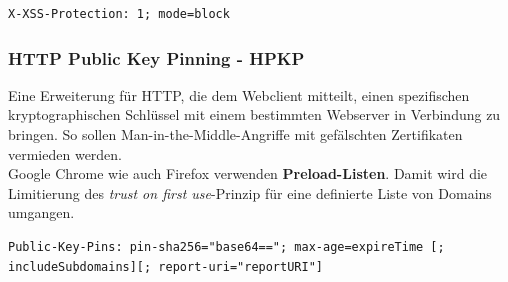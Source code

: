\begin{lstlisting}[language={},caption=Beispiel des X-XSS-Protection Headers]
X-XSS-Protection: 1; mode=block
\end{lstlisting}

\subsubsection{HTTP Public Key Pinning - HPKP}
Eine Erweiterung für HTTP, die dem Webclient mitteilt, einen spezifischen kryptographischen Schlüssel mit einem bestimmten Webserver in Verbindung zu bringen. So sollen Man-in-the-Middle-Angriffe mit gefälschten Zertifikaten vermieden werden.\\

Google Chrome wie auch Firefox verwenden \textbf{Preload-Listen}. Damit wird die Limitierung des \textit{trust on first use}-Prinzip für eine definierte Liste von Domains umgangen.

\begin{lstlisting}[language={},caption=Beispiel des HPKP-Headers]
Public-Key-Pins: pin-sha256="base64=="; max-age=expireTime [; includeSubdomains][; report-uri="reportURI"]
\end{lstlisting}